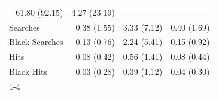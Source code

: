 \begin{table}[!h]
\begin{tabular}{llll}
  \multicolumn{1}{r}{61.80 (92.15)} &
  \multicolumn{1}{r}{4.27 (23.19)} \\
\multicolumn{1}{l}{\hspace{1em}Searches} &
  \multicolumn{1}{r}{0.38 (1.55)} &
  \multicolumn{1}{r}{3.33 (7.12)} &
  \multicolumn{1}{r}{0.40 (1.69)} \\
\multicolumn{1}{l}{\hspace{1em}Black Searches} &
  \multicolumn{1}{r}{0.13 (0.76)} &
  \multicolumn{1}{r}{2.24 (5.41)} &
  \multicolumn{1}{r}{0.15 (0.92)} \\
\multicolumn{1}{l}{\hspace{1em}Hits} &
  \multicolumn{1}{r}{0.08 (0.42)} &
  \multicolumn{1}{r}{0.56 (1.41)} &
  \multicolumn{1}{r}{0.08 (0.44)} \\
\multicolumn{1}{l}{\hspace{1em}Black Hits} &
  \multicolumn{1}{r}{0.03 (0.28)} &
  \multicolumn{1}{r}{0.39 (1.12)} &
  \multicolumn{1}{r}{0.04 (0.30)} \\
\cline{1-4}
\end{tabular}
\end{table}
